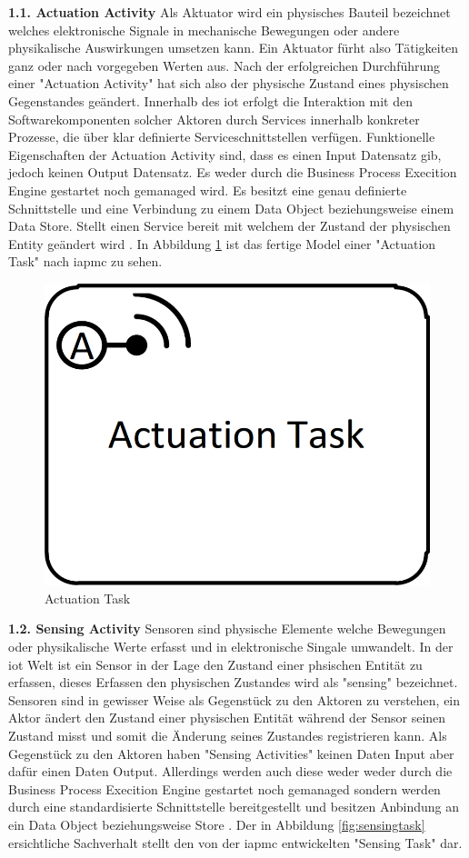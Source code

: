 \documentclass[a4paper, 12pt, twoside, headsepline=true]{scrartcl} %
\begin{document}
\textbf{1.1. Actuation Activity}
\newline
Als Aktuator wird ein physisches Bauteil bezeichnet welches elektronische Signale in mechanische Bewegungen oder andere physikalische Auswirkungen umsetzen kann. Ein Aktuator fürht also Tätigkeiten ganz oder nach vorgegeben Werten aus. Nach der erfolgreichen Durchführung einer "Actuation Activity" hat sich also der physische Zustand eines physischen Gegenstandes geändert. Innerhalb des \ac{iot} erfolgt die Interaktion mit den Softwarekomponenten solcher Aktoren durch Services innerhalb konkreter Prozesse, die über klar definierte Serviceschnittstellen verfügen. Funktionelle Eigenschaften der Actuation Activity sind, dass es einen Input Datensatz gib, jedoch keinen Output Datensatz. Es weder durch die Business Process Execition Engine gestartet noch gemanaged wird. Es besitzt eine genau definierte Schnittstelle und eine Verbindung zu einem Data Object beziehungsweise einem Data Store. Stellt einen Service bereit mit welchem der Zustand der physischen Entity geändert wird \cite[S.41]{conceptsiotawarepm}. In Abbildung \ref{fig:actuationtask} ist das fertige Model einer "Actuation Task" nach \ac{iapmc} zu sehen.

\begin{figure}[H]
	\includegraphics[height=2 cm,keepaspectratio,center]{figures/ActuationTask}
	\caption{Actuation Task \cite[S.44]{conceptsiotawarepm}}
	\label{fig:actuationtask}
\end{figure} 

\textbf{1.2. Sensing Activity}
\newline
Sensoren sind physische Elemente welche Bewegungen oder physikalische Werte erfasst und in elektronische Singale umwandelt. In der \ac{iot} Welt ist ein Sensor in der Lage den Zustand einer phsischen Entität zu erfassen, dieses Erfassen den physischen Zustandes wird als "sensing" bezeichnet. Sensoren sind in gewisser Weise als Gegenstück zu den Aktoren zu verstehen, ein Aktor ändert den Zustand einer physischen Entität während der Sensor seinen Zustand misst und somit die Änderung seines Zustandes registrieren kann. Als Gegenstück zu den Aktoren haben "Sensing Activities" keinen Daten Input aber dafür einen Daten Output. Allerdings werden auch diese weder weder durch die Business Process Execition Engine gestartet noch gemanaged sondern werden durch eine standardisierte Schnittstelle bereitgestellt und besitzen Anbindung an ein Data Object beziehungsweise Store \cite[S.45]{conceptsiotawarepm}. Der in Abbildung \ref{fig:sensingtask} ersichtliche Sachverhalt stellt den von der \ac{iapmc} entwickelten "Sensing Task" dar.
\end{document}
